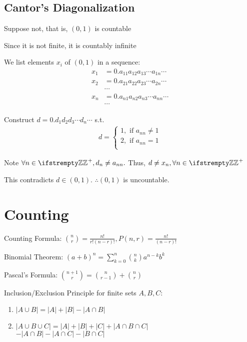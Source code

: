 \documentclass[12pt, a4paper]{article}
\begin{document}
\begin{multicols*}{3}
\subsection{Cantor's Diagonalization}
\begin{enumproof}[parsep=0em]
\item Suppose not, that is, $(0,1)$ is countable
\item Since it is not finite, it is countably infinite
\item We list elements $x_i$ of $(0,1)$ in a sequence:
  \begin{align*} 
    x_1 &= 0.a_{11}a_{12}a_{13}\cdots a_{1n}\cdots\\
    x_2 &= 0.a_{21}a_{22}a_{23}\cdots a_{2n}\cdots\\
        &\cdots\\
    x_n &= 0.a_{n1}a_{n2}a_{n3}\cdots a_{nn}\cdots\\
        &\cdots
  \end{align*}
\item Construct $d=0.d_1d_2d_3\cdots d_n \cdots$ s.t.
  \begin{align*}
      d= \begin{cases}
      1, \text{ if }a_{nn}\neq 1\\
      2, \text{ if }a_{nn}= 1\\
    \end{cases}
  \end{align*}
\item Note $\forall n \in \ZZ^{+}, d_n\neq a_{nn}.$ Thus, $d\neq x_n, \forall n \in \ZZ^+$
\item This contradicts $d\in(0,1)$. $\therefore (0,1)$ is uncountable.
\end{enumproof}

\colbreak
\section{Counting}
Counting Formula: $\displaystyle \binom nr = \frac{n!}{r!(n-r)!}, P(n, r) = \frac{n!}{(n-r)!}$

Binomial Theorem: $\displaystyle (a+b)^n = \sum^n_{k=0} \binom nk a^{n-k}b^k$

Pascal's Formula: $\displaystyle \binom {n+1}r = \binom n{r-1} + \binom nr$

Inclusion/Exclusion Principle for finite sets $A,B,C$:
\begin{enumerate}[\roman*.]
  \item $|A \cup B|= |A| + |B| - |A\cap B|$
  \item $|A \cup B \cup C|= |A| + |B| + |C| + |A\cap B\cap C|$\\\hspace{6.7em}$- |A\cap B| - |A\cap C| - |B\cap C|$
\end{enumerate}


\end{multicols*}
\end{document}
